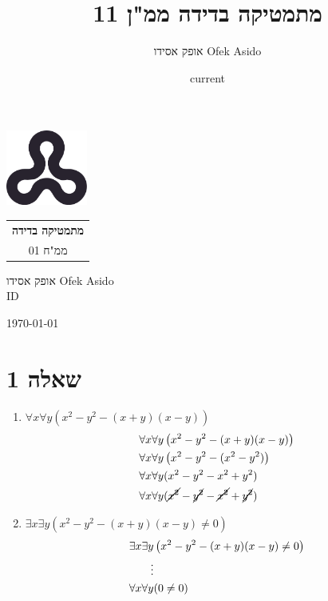 \documentclass[a4paper,12pt]{report}
\title{מתמטיקה בדידה ממ"ן 11} %
\author{אופק אסידו \textenglish{Ofek Asido}}
\date{current}
\begin{document}
\begin{titlepage}
	\centering
	\vspace*{2em}

	\includegraphics[width=0.2\textwidth]{assets/ou_logo}

	\vspace{2cm}

	\begin{tabular}{c}
		{\Huge\textbf{מתמטיקה בדידה}} \\
		{\LARGE ממ"ח 01}
	\end{tabular}

	\vspace{2cm}

	{\Large אופק אסידו \textenglish{Ofek Asido}\\ID}

	\vspace{10cm}

	{\large \hebrewfont
		\today %
	}

	\vspace*{2em}
\end{titlepage}

\section*{שאלה 1}
\begin{enumerate}
	\item{
	      $\forall x \forall y \left(x^2 - y^2 - (x+y)(x-y)\right)$
	      \begin{align}
		      \forall x \forall y & \left(x^2 - y^2 - (x+y)(x-y)\right)                         \\
		      \forall x \forall y & \left(x^2 - y^2 - (x^2-y^2)\right)                          \\
		      \forall x \forall y & (x^2 - y^2 - x^2 + y^2)                                     \\
		      \forall x \forall y & (\cancel{x^2} - \cancel{y^2} - \cancel{x^2} + \cancel{y^2})
	      \end{align}
	      }
	\item{
	      $\exists x \exists y \left(x^2 - y^2 - (x+y)(x-y) \neq 0\right)$
	      }
	      \begin{align}
		      \exists x \exists y & \left(x^2 - y^2 - (x+y)(x-y) \neq 0\right) \\*
		      \notag \vdots                                                    \\
		      \forall x \forall y & (0 \neq 0)
	      \end{align}
\end{enumerate}
\end{document}
